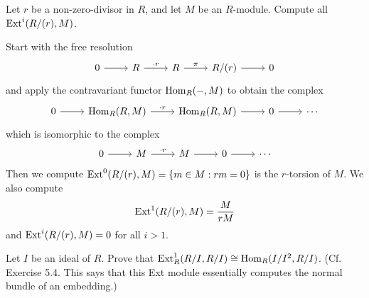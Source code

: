 \documentclass[../../master.tex]{subfiles}
\begin{document}
\begin{problem}
    Let $r$ be a non-zero-divisor in $R$, and let $M$ be an $R$-module.
    Compute all $\operatorname{Ext}^{i}(R/(r), M)$.
\end{problem}

\begin{solution}
    Start with the free resolution
    \[
    \begin{tikzcd}
        0 & R & R & R/(r) & 0
        \arrow[from=1-1, to=1-2]
        \arrow[from=1-2, to=1-3, "\cdot r"]
        \arrow[from=1-3, to=1-4, "\pi"]
        \arrow[from=1-4, to=1-5]
    \end{tikzcd}
    \]
    and apply the contravariant functor $\operatorname{Hom}_R(-, M)$ to obtain the complex
    \[
    \begin{tikzcd}
        0 & \Hom_R(R, M) & \Hom_R(R, M) & 0 & \cdots
        \arrow[from=1-1, to=1-2]
        \arrow[from=1-2, to=1-3, "\cdot r"]
        \arrow[from=1-3, to=1-4]
        \arrow[from=1-4, to=1-5]
    \end{tikzcd}
    \]
    which is isomorphic to the complex
    \[
    \begin{tikzcd}
        0 & M & M & 0 & \cdots
        \arrow[from=1-1, to=1-2]
        \arrow[from=1-2, to=1-3, "\cdot r"]
        \arrow[from=1-3, to=1-4]
        \arrow[from=1-4, to=1-5]
    \end{tikzcd}
    \]
    Then we compute $\operatorname{Ext}^{0}(R/(r), M) = \{m \in M : rm = 0\}$ is the $r$-torsion of $M$.
    We also compute
    \[
        \operatorname{Ext}^{1}(R/(r), M) = \frac{M}{rM}
    \]
    and $\operatorname{Ext}^{i}(R/(r), M) = 0$ for all $i > 1$.
\end{solution}

\begin{problem}
    Let $I$ be an ideal of $R$.
    Prove that $\operatorname{Ext}_R^{1}(R/I, R/I) \cong \operatorname{Hom}_R(I/I^2, R/I)$.
    (Cf. Exercise 5.4.
    This says that this Ext module essentially computes the normal bundle of an embedding.)
\end{problem}
\end{document}
